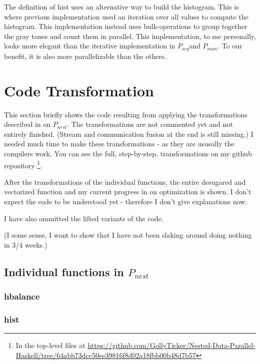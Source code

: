\documentclass{article}
\newcommand{\seq}[0]{$P_{seq}$}
\newcommand{\man}[0]{$P_{man}$}
\newcommand{\ndpn}[0]{$P_{nest}$}
\newcommand{\note}[1]{{\tiny (#1)}}
\begin{document}
      The definition of hist uses an alternative way to build the histogram.
      This is where previous implementation used an iteration
      over all values to compute the histogram. This implementation instead
      uses bulk-operations to group together the gray tones and count them in parallel.
      This implementation, to me personally, looks more elegant than the iterative
      implementation in \seq and \man. To our benefit, it is also more parallelizable
      than the others.
  
  \newpage
  
  \section{Code Transformation}
    This section briefly shows the code resulting from applying
    the transformations described in \cite{Harness2008} on \ndpn.
    The transformations are not commented yet and not entirely finished.
    (Stream and communication fusion at the end is still missing.)
    I needed much time to make these transformations - as they are ususally
    the compilers work. You can see the full, step-by-step, transformations on my github repository \footnote[1]{In the top-level files at \url{https://github.com/GollyTicker/Nested-Data-Parallel-Haskell/tree/64abb73dcc50ee39816f8d02a18fbb00b48d7b57}}.

    After the transformations of the individual functions, the entire
    desugared and vectorized function and my current progress in on optimization is shown.
    I don't expect the code to be understood yet - therefore I don't give explanations now.
    
    I have also ommitted the lifted variants of the code.
    
    \note{I some sense, I want to show that I have not been slaking around doing nothing in 3/4 weeks.}
    
    \subsection{Individual functions in \ndpn}
    
      \subsubsection{hbalance}
        
        
        
      \subsubsection{hist}
        
\end{document}

